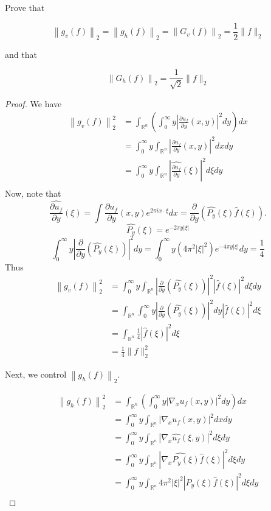 \begin{enumerate}
Prove that

\[
\left\|g_v(f)\right\|_2=\left\|g_h(f)\right\|_2=\left\|G_v(f)\right\|_2=\frac{1}{2}\|f\|_2
\]

and that

\[
\left\|G_h(f)\right\|_2=\frac{1}{\sqrt{2}}\|f\|_2
\]

\begin{proof}
	We have
	\begin{align*}
		\left\|g_v(f)\right\|_2^2
		&= \int _{\mathbb{R}^n} \left( \int _0^\infty y \left| \frac{\partial u_f}{\partial y} (x, y) \right| ^2 dy \right) dx \\
		&= \int_0 ^\infty y \int _{\mathbb{R}^n} \left| \frac{\partial u_f}{\partial y} (x, y) \right| ^2 dx dy \\
		&= \int _0^\infty y \int _{\mathbb{R}^n} \left| \widehat{ \frac{\partial u_f}{\partial y} }(\xi)\right| ^2 d \xi dy \\
	\end{align*}
	Now, note that
	\[
		\widehat{ \frac{\partial u_f}{\partial y} }(\xi) = \int \frac{\partial u_f}{\partial y} (x, y) e^{2 \pi i x \cdot \xi} dx = \frac{\partial}{\partial y} \left( \hat{P_y}(\xi) \hat{f}(\xi)
		\right) 
	.\]
	\[
		\hat{P_y} (\xi) = e^{-2 \pi y |\xi|}
	\]
	\[
			\int _0^\infty y \left| \frac{\partial}{\partial y} \left( \hat{P_y}(\xi) \right) \right| ^2 d y = \int _0^\infty y (4 \pi^2 |\xi|^2) e ^{-4 \pi y |\xi|} dy = \frac{1}{4}
	\]
	Thus
	\begin{align*}
		\left\|g_v(f)\right\|_2^2
		&= \int _0^\infty y \int _{\mathbb{R}^n} \left| \frac{\partial}{\partial y} \left( \hat{P_y}(\xi) \right) \right| ^2 |\hat{f}(\xi)|^2 d \xi dy \\
		&= \int_ {\mathbb{R}^n} \int _0^\infty y \left| \frac{\partial}{\partial y} \left( \hat{P_y}(\xi) \right) \right| ^2 d y |\hat{f}(\xi)|^2 d \xi \\
		&= \int _{\mathbb{R}^n} \frac{1}{4} |\hat{f}(\xi)|^2 d \xi \\
		&= \frac{1}{4} \|f\|_2^2
	\end{align*}
	
	Next, we control $\left\|g_h(f)\right\|_2$.

	\begin{align*}
		\left\|g_h(f)\right\|_2^2
		&= \int _{\mathbb{R}^n} \left( \int _0^\infty y \left| \nabla_x u_f(x, y) \right| ^2 dy \right) dx \\
		&= \int_0 ^\infty y \int _{\mathbb{R}^n} \left| \nabla_x u_f(x, y) \right| ^2 dx dy \\
		&= \int _0^\infty y \int _{\mathbb{R}^n} \left| \nabla_x \widehat{u_f}(\xi, y) \right| ^2 d \xi dy \\
		&= \int _0^\infty y \int _{\mathbb{R}^n} \left| \widehat{\nabla_x  P_y(\xi)} \hat{f}(\xi) \right| ^2 d \xi dy \\
		&= \int _0^\infty y \int _{\mathbb{R}^n} 4 \pi^2 |\xi|^2 \left| P_y(\xi) \hat{f}(\xi)  \right| ^2 d \xi dy \\
	\end{align*}


\end{proof}
\end{enumerate}
